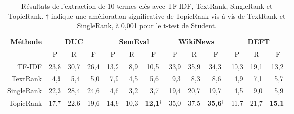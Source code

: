     \begin{table}
      \centering
      \begin{tabular}{@{~}r@{~~}c@{~~}c@{~~}c@{~~}c@{~~}c@{~~}c@{~~}c@{~~}c@{~~}c@{~~}c@{~~}c@{~~}c@{~}}
        \toprule
        \multirow{2}{*}[-2pt]{\textbf{Méthode}} & \multicolumn{3}{c}{\textbf{DUC}} & \multicolumn{3}{c}{\textbf{SemEval}} & \multicolumn{3}{c}{\textbf{WikiNews}} & \multicolumn{3}{c}{\textbf{DEFT}}\\
        \cmidrule(r){2-4}\cmidrule(r){5-7}\cmidrule(r){8-10}\cmidrule{11-13}
        & P & R & F & P & R & F & P & R & F & P & R & F\\
        \midrule
        TF-IDF & 23,8 & 30,7 & 26,4 & 13,2 & $~~$8,9 & 10,5$^{~}$ & 33,9 & 35,9 & 34,3$^{~}$ & 10,3 & 19,1 & 13,2$^{~}$\\
        TextRank & $~~$4,9 & $~~$5,4 & $~~$5,0 & $~~$7,9 & $~~$4,5 & $~~$5,6$^{~}$ & $~~$9,3 & $~~$8,3 & $~~$8,6$^{~}$ & $~~$4,9 & $~~$7,1 & $~~$5,7$^{~}$\\
        SingleRank & 22,3 & 28,4 & 24,6 & $~~$4,6 & $~~$3,2 & $~~$3,7$^{~}$ & 19,4 & 20,7 & 19,7$^{~}$ & $~~$4,5 & $~~$9,0 & $~~$5,9$^{~}$\\
        TopicRank & 17,7 & 22,6 & 19,6 & 14,9 & 10,3 & \textbf{12,1}$^\dagger$ & 35,0 & 37,5 & \textbf{35,6}$^\dagger$ & 11,7 & 21,7 & \textbf{15,1}$^\dagger$\\
        \bottomrule
      \end{tabular}
      \caption{Résultats de l'extraction de 10 termes-clés avec TF-IDF,
               TextRank, SingleRank et TopicRank. $\dagger$ indique une
               amélioration significative de TopicRank vis-à-vis de TextRank et
               SingleRank, à 0,001 pour le t-test de Student.
               \label{tab:resultats_globaux}}
    \end{table}

